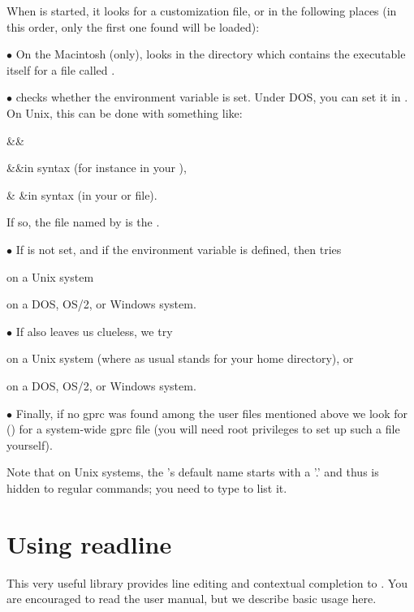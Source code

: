 When  is started, it looks for a customization file, or  in the
following places (in this order, only the first one found will be loaded):

\noindent$\bullet$ On the Macintosh (only),  looks in the directory
which contains the  executable itself for a file called .

\noindent$\bullet$  checks whether the environment variable
 is set. Under DOS, you can set it in . On Unix,
this can be done with something like: \smallskip

\settabs\+\indent&\quad&\cr

\+&\quad&in  syntax
(for instance in your ),\cr

\+& &in  syntax
(in your  or  file).\cr

\noindent If so, the file named by  is the .

\noindent$\bullet$ If  is not set, and if the environment variable
 is defined,  then tries

 on a Unix system

 on a DOS, OS/2, or Windows system.

\noindent$\bullet$ If  also leaves us clueless, we try

\strut{} on a Unix system (where as usual \kbd{\til} stands for
your home directory), or

 on a DOS, OS/2, or Windows system.

\noindent$\bullet$ Finally, if no gprc was found among the user files
mentioned above we look for  ()
for a system-wide gprc file (you will need root privileges to set up such a
file yourself).

Note that on Unix systems, the 's default name starts with a '.' and
thus is hidden to regular  commands; you need to type  to
list it.


\section{Using readline} 

This very useful library provides line editing and contextual completion
to . You are encouraged to read the  user manual,
but we describe basic usage here.

